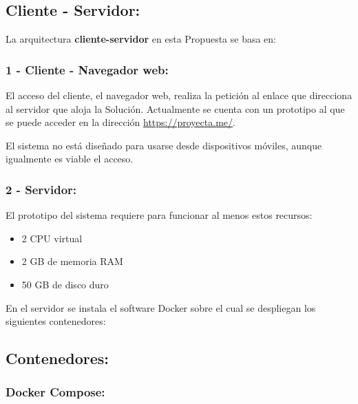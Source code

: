 \documentclass[
  10,
  openany]{book}
\providecommand{\tightlist}{%
  \setlength{\itemsep}{0pt}\setlength{\parskip}{0pt}}
\begin{document}
\hypertarget{cliente---servidor}{%
\subsection{Cliente - Servidor:}\label{cliente---servidor}}

La arquitectura \textbf{cliente-servidor} en esta Propuesta se basa en:

\hypertarget{cliente---navegador-web}{%
\subsubsection{1 - Cliente - Navegador web:}\label{cliente---navegador-web}}

El acceso del cliente, el navegador web, realiza la petición al enlace que direcciona al servidor que aloja la Solución. Actualmente se cuenta con un prototipo al que se puede acceder en la dirección \url{https://proyecta.me/}.

El sistema no está diseñado para usarse desde dispositivos móviles, aunque igualmente es viable el acceso.

\hypertarget{servidor}{%
\subsubsection{2 - Servidor:}\label{servidor}}

El prototipo del sistema requiere para funcionar al menos estos recursos:

\begin{itemize}
\tightlist
\item
  2 CPU virtual
\item
  2 GB de memoria RAM
\item
  50 GB de disco duro
\end{itemize}

En el servidor se instala el software Docker sobre el cual se despliegan los siguientes contenedores:

\hypertarget{contenedores}{%
\subsection{Contenedores:}\label{contenedores}}

\hypertarget{docker-compose}{%
\subsubsection{Docker Compose:}\label{docker-compose}}
\end{document}
